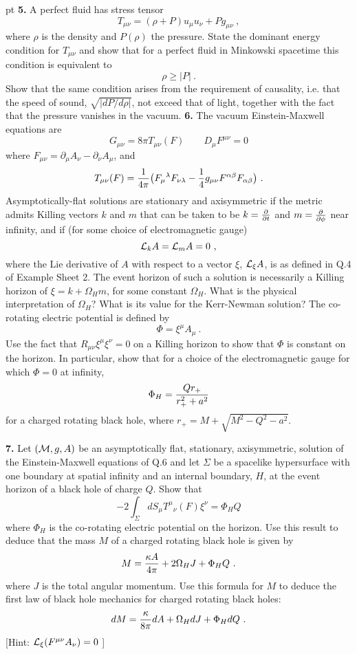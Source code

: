  pt
\noindent
{\bf 5.} A perfect fluid has stress tensor
$$
T_{\mu\nu} = (\rho + P)u_\mu u_\nu + P g_{\mu\nu}\ ,
$$
where $\rho$ is the density and $P(\rho)$ the pressure. State the
dominant energy condition for $T_{\mu\nu}$ and show that
for a perfect fluid in Minkowski spacetime this condition
is equivalent to  
$$ 
\rho\ge |P|\ .
$$
Show that the same condition arises from the requirement of
causality, i.e. that the speed of sound, $\sqrt{|dP/d\rho|}$, not
exceed that of light, together with the fact that the pressure 
vanishes in the vacuum.
\vskip 10pt
\noindent
{\bf 6.} The vacuum Einstein-Maxwell equations are
$$
G_{\mu\nu}= 8\pi T_{\mu\nu}(F) \qquad D_\mu F^{\mu\nu}=0
$$
where $F_{\mu\nu}= \partial_{\mu}A_{\nu}- \partial_\nu A_\mu$, and
$$
T_{\mu\nu}(F)= {1\over 4\pi}\big(F_{\mu}{}^\lambda F_{\nu\lambda}
-{1\over4}g_{\mu\nu}F^{\alpha\beta}F_{\alpha\beta}\big)\ .
$$
Asymptotically-flat solutions are stationary and axisymmetric if
the metric admits Killing vectors $k$ and $m$ that can be taken to be
$k={\partial\over\partial t}$ and $m={\partial\over\partial \phi}$ near
infinity, and if (for some choice of electromagnetic gauge)
$$
{\cal L}_k A={\cal L}_m A=0\ ,
$$
where the Lie derivative of $A$ with respect to a vector $\xi$, 
${\cal L}_\xi A$, is as defined in Q.4 of Example Sheet 2. The event
horizon of such a solution is necessarily a Killing horizon of $\xi =
k+\Omega_H m$, for some constant $\Omega_H$. What is the physical
interpretation of $\Omega_H$? What is its value for the Kerr-Newman
solution? The co-rotating electric potential is defined by 
$$ 
\Phi = \xi^\mu A_\mu \ .
$$
Use the fact that $R_{\mu\nu}\xi^\mu\xi^\nu=0$ on a Killing horizon
to show that $\Phi$ is constant on the horizon. In particular, show
that for a choice of the electromagnetic gauge for which $\Phi=0$ at
infinity, 
$$
\Phi_H= {Qr_+\over r_+^2 +a^2}
$$
for a charged rotating black hole, where $r_+= M+\sqrt{M^2-Q^2-a^2}$.

\vskip 10pt
\noindent
{\bf 7.} Let $({\cal M},g,A)$ be an asymptotically flat, stationary,
axisymmetric, solution of the Einstein-Maxwell equations of Q.6 and
let $\Sigma$ be a spacelike hypersurface with one boundary at spatial
infinity and an internal boundary, $H$, at the event horizon of a black
hole of charge $Q$. Show that    
$$ 
-2\int_\Sigma dS_\mu T^\mu{}_\nu(F)\xi^\nu = \Phi_H Q  
$$
where $\Phi_H$ is the co-rotating electric potential on the horizon. 
Use this result to deduce that the mass $M$ of a charged rotating black
hole is given by 
$$
M= {\kappa A\over 4\pi} + 2\Omega_H J + \Phi_H Q\ .
$$
where $J$ is the total angular momentum.
Use this formula for $M$ to deduce the first law of black hole
mechanics for charged rotating black holes: 
$$
dM= {\kappa \over 8\pi}dA + \Omega_H dJ + \Phi_H dQ\ .
$$
[Hint: ${\cal L}_\xi (F^{\mu\nu}A_\nu)=0$ ]

